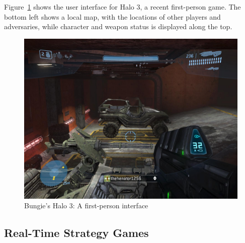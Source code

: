Figure~\ref{fig:halo3} shows the user interface for Halo 3, a recent first-person game. The bottom left shows a local map, with the locations of other players and adversaries, while character and weapon status is displayed along the top. 

\begin{figure}[ht]
\begin{center}
\includegraphics[width=6in]{images/halo3.jpg}
\caption{Bungie's Halo 3: A first-person interface \label{fig:halo3}}
\end{center}
\end{figure}


\subsection{Real-Time Strategy Games} %
\label{sub:RTS_games}



